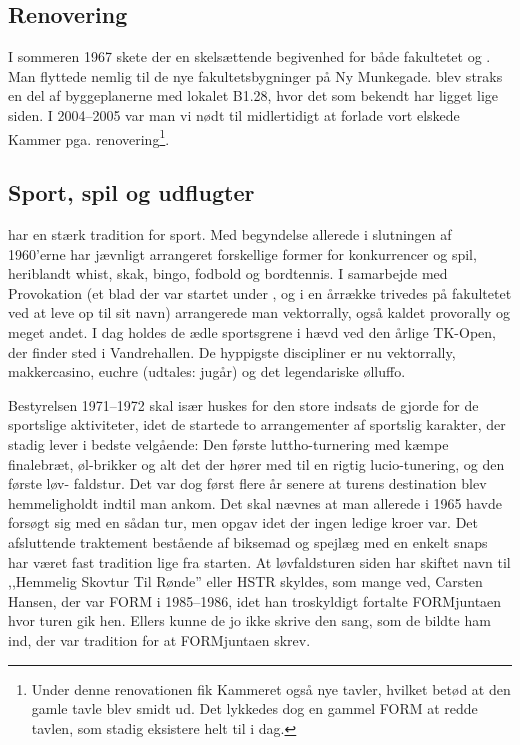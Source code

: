 \subsection{Renovering}
I sommeren 1967 skete der en skelsættende begivenhed for både fakultetet og \TKET. Man flyttede nemlig til de nye fakultetsbygninger på Ny Munkegade. \TKET blev straks en del af byggeplanerne med lokalet B1.28, hvor det som bekendt har ligget lige siden. I 2004--2005 var man vi nødt til midlertidigt at forlade vort elskede Kammer pga. renovering\footnote{Under denne renovationen fik Kammeret også nye tavler, hvilket betød at den gamle tavle blev smidt ud. Det lykkedes dog en gammel FORM at redde tavlen, som stadig eksistere helt til i dag.}.

\subsection{Sport, spil og udflugter}
\TKET har en stærk tradition for sport. Med begyndelse allerede i slutningen af 1960'erne har \TKET jævnligt arrangeret forskellige former for konkurrencer og spil, heriblandt whist, skak, bingo, fodbold og bordtennis. I samarbejde med Provokation (et blad der var startet under \TKET, og i en årrække trivedes på fakultetet ved at leve op til sit navn) arrangerede man vektorrally, også kaldet provorally og meget andet. I dag holdes de ædle sportsgrene i hævd ved den årlige TK-Open, der finder sted i Vandrehallen. De hyppigste discipliner er nu vektorrally, makkercasino, euchre (udtales: jugår) og det legendariske ølluffo.

Bestyrelsen 1971--1972 skal især huskes for den store indsats de gjorde for de sportslige aktiviteter, idet de startede to arrangementer af sportslig karakter, der stadig lever i bedste velgående: Den første luttho-turnering med kæmpe finalebræt, øl-brikker og alt det der hører med til en rigtig lucio-tunering, og den første løv- faldstur. Det var dog først flere år senere at turens destination blev hemmeligholdt indtil man ankom. Det skal nævnes at man allerede i 1965 havde forsøgt sig med en sådan tur, men opgav idet der ingen ledige kroer var. Det afsluttende traktement bestående af biksemad og spejlæg med en enkelt snaps har været fast tradition lige fra starten. At løvfaldsturen siden har skiftet navn til ,,Hemmelig Skovtur Til Rønde'' eller HSTR skyldes, som mange ved, Carsten Hansen, der var FORM i 1985--1986, idet han troskyldigt fortalte FORMjuntaen hvor turen gik hen. Ellers kunne de jo ikke skrive den sang, som de bildte ham ind, der var tradition for at FORMjuntaen skrev.

